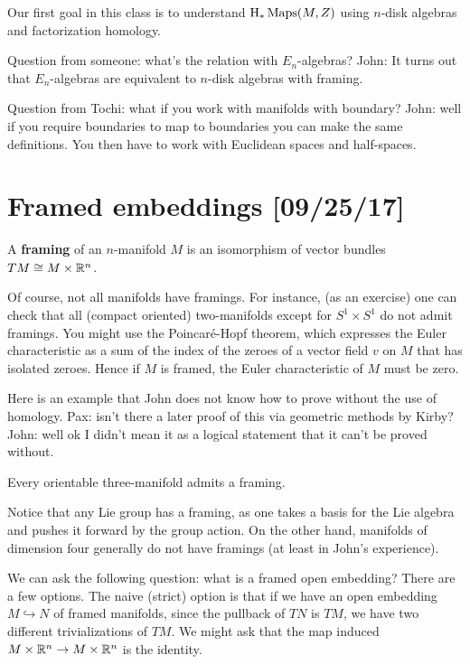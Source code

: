 \documentclass{amsart}
\begin{document}
Our first goal in this class is to understand $\operatorname{H}_*\operatorname{Maps}(M,Z)$ using $n$-disk
algebras and factorization homology.

Question from someone: what's the relation with $E_n$-algebras? John: It turns
out that $E_n$-algebras are equivalent to $n$-disk algebras with framing.

Question from Tochi: what if you work with manifolds with boundary? John: well
if you require boundaries to map to boundaries you can make the same definitions.
You then have to work with Euclidean spaces and half-spaces.

\section{Framed embeddings [09/25/17]}

\begin{definition}
    A \textbf{framing} of an $n$-manifold $M$ is an isomorphism of vector bundles
    $TM \cong M\times \mathbb{R}^n$.
\end{definition}

Of course, not all manifolds have framings. For instance, (as an exercise) one
can check that all (compact oriented) two-manifolds except for $S^1\times S^1$ do not admit framings.
You might use the Poincar\'e-Hopf theorem, which expresses the Euler characteristic
as a sum of the index of the zeroes of a vector field $v$ on $M$ that has isolated
zeroes. Hence if $M$ is framed, the Euler characteristic of $M$ must be zero.

Here is an example that John does not know how to prove without the use of homology.
Pax: isn't there a later proof of this via geometric methods by Kirby? John: well ok
I didn't mean it as a logical statement that it can't be proved without.
\begin{theorem}[Whitney or Wu]
    Every orientable three-manifold admits a framing.
\end{theorem}

Notice that any Lie group has a framing, as one takes a basis for the Lie algebra
and pushes it forward by the group action. On the other hand, manifolds of dimension
four generally do not have framings (at least in John's experience).

We can ask the following question: what is a framed open embedding? There are a few options.
The naive (strict) option is that if we have an open embedding $M\hookrightarrow N$ of
framed manifolds, since the pullback of $TN$ is $TM$, we have two different trivializations
of $TM$. We might ask that the map induced $M\times\mathbb{R}^n\to M\times\mathbb{R}^n$ is the identity.
\end{document}
